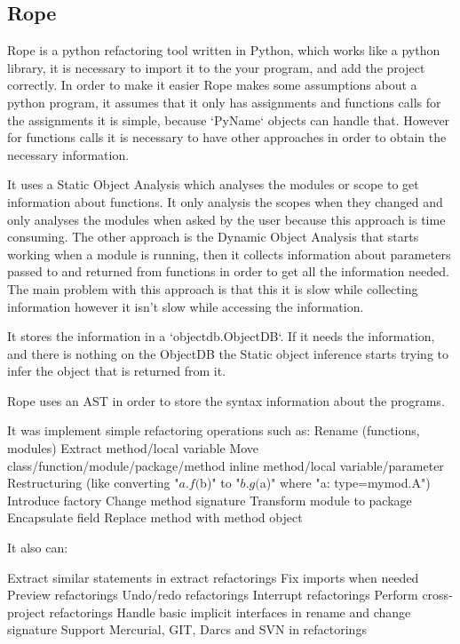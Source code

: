 \subsection{Rope}

Rope is a python refactoring tool written in Python, which works like a python library, it is necessary to import it to the your program, and add the project correctly.
In order to make it easier Rope makes some assumptions about a python program, it assumes that it only has assignments and functions calls %
for the assignments it is simple, because `PyName` objects can handle that. However for functions calls it is necessary to have other approaches in order to obtain the necessary information. 

It uses a Static Object Analysis which analyses the modules or scope to get information about functions. It only analysis the scopes when they changed and only analyses the modules when asked by the user because this approach is time consuming. The other approach is the Dynamic Object Analysis that starts working when a module is running, then it collects information about parameters passed to and returned from functions in order to get all the information needed. The main problem with this approach is that this it is slow while collecting information however it isn't slow while accessing the information.

It stores the information in a `objectdb.ObjectDB`. If it needs the information, and there is nothing on the ObjectDB the Static object inference starts trying to infer the object that is returned from it.

Rope uses an AST in order to store the syntax information about the programs.

It was implement simple refactoring operations such as:
	Rename (functions, modules)
	Extract method/local variable
	Move class/function/module/package/method
	inline method/local variable/parameter
	Restructuring (like converting "${a}.f(${b})" to "${b}.g(${a})" where "a: type=mymod.A") 
	Introduce factory
	Change method signature
	Transform module to package
	Encapsulate field
	Replace method with method object

It also can:

    Extract similar statements in extract refactorings
    Fix imports when needed
    Preview refactorings
    Undo/redo refactorings
    Interrupt refactorings
    Perform cross-project refactorings
    Handle basic implicit interfaces in rename and change signature
    Support Mercurial, GIT, Darcs and SVN in refactorings




